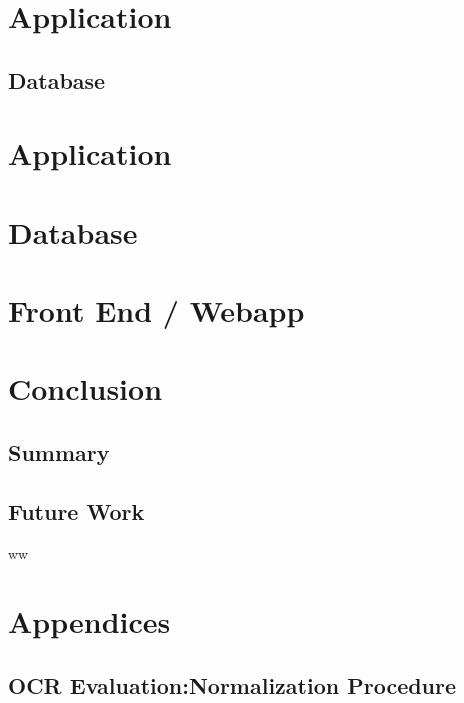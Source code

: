 \documentclass[11pt]{article}
\begin{document}
\section{Application}

\subsection{Database}



\section{Application}
    \section{Database}
    \section{Front End / Webapp}

\section{Conclusion}
    \subsection{Summary}
    \subsection{Future Work}
    ww




%



\appendix
\section{Appendices}
\subsection{OCR Evaluation:Normalization Procedure}
    
    
\end{document}
